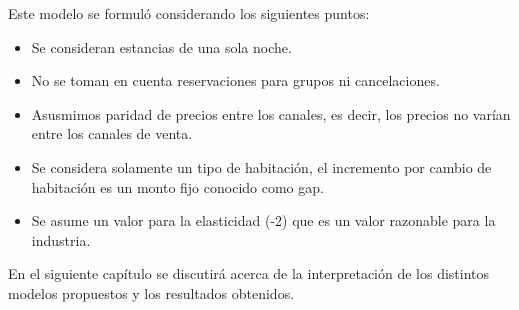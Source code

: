 Este modelo se formuló considerando los siguientes puntos:
\begin{itemize}[noitemsep]
  \item Se consideran estancias de una sola noche.
  \item No se toman en cuenta reservaciones para grupos ni cancelaciones.
  \item Asusmimos paridad de precios entre los canales, es decir, los precios no varían entre los canales de venta.
  \item Se considera solamente un tipo de habitación, el incremento por cambio de habitación es un monto fijo conocido como gap.
  \item Se asume un valor para la elasticidad (-2) que es un valor razonable para la industria.
\end{itemize}

En el siguiente capítulo se discutirá acerca de la interpretación de los distintos modelos propuestos y los resultados obtenidos.
